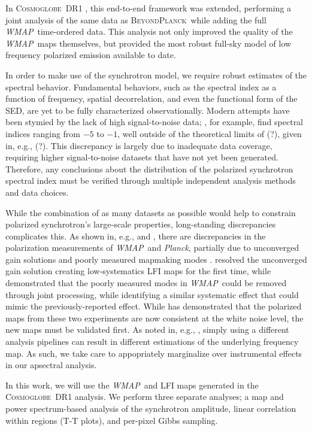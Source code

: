 \documentclass[twocolumn]{../../common/aa}
\def\WMAP{\emph{WMAP}}
\def\Planck{\emph{Planck}}
\newcommand{\bp}{\textsc{BeyondPlanck}}
\newcommand{\cosmoglobe}{\textsc{Cosmoglobe}}
\begin{document}
In \cosmoglobe\ DR1 \citep{watts2023_dr1}, this end-to-end framework was extended, performing a joint analysis of the same data as \bp\ while adding the full \WMAP\ time-ordered data. This analysis not only improved the quality of the \WMAP\ maps themselves, but provided the most robust full-sky model of low frequency polarized emission available to date.

In order to make use of the synchrotron model, we require robust estimates of the spectral behavior. Fundamental behaviors, such as the spectral index as a function of frequency, spatial decorrelation, and even the functional form of the SED, are yet to be fully characterized observationally. Modern attempts have been stymied by the lack of high signal-to-noise data; \citet{deBelsunce:2022}, for example, find spectral indices ranging from $-5$ to $-1$, well outside of the theoretical limits of (?), given in, e.g., (?). This discrepancy is largely due to inadequate data coverage, requiring higher signal-to-noise datasets that have not yet been generated. Therefore, any conclusions about the distribution of the polarized synchrotron spectral index must be verified through multiple independent analysis methods and data choices.


While the combination of as many datasets as possible would help to constrain polarized synchrotron's large-scale properties, long-standing discrepancies complicates this. As shown in, e.g., \citet{planck2014-a12} and \citet{weiland:2018}, there are discrepancies in the polarization measurements of \WMAP\ and \Planck, partially due to unconverged gain solutions \citep{planck2016-l02} and poorly measured mapmaking modes \citep{bennett2012}. \citet{bp01} resolved the unconverged gain solution creating low-systematics LFI maps for the first time, while \citet{bp17} demonstrated that the poorly measured modes in \WMAP\ could be removed through joint processing, while identifying a similar systematic effect that could mimic the previously-reported effect.  While \citet{watts2023_dr1} has demonstrated that the polarized maps from these two experiments are now consistent at the white noise level, the new maps must be validated first. As noted in, e.g., \citet{weiland:2022}, simply using a different analysis pipelines can result in different estimations of the underlying frequency map. As such, we take care to appopriately marginalize over instrumental effects in our apsectral analysis.


In this work, we will use the \WMAP\ and LFI maps generated in the \cosmoglobe\ DR1 analysis. We perform three separate analyses; a map and power spectrum-based analysis of the synchrotron amplitude, linear correlation within regions (T-T plots), and per-pixel Gibbs sampling.
\end{document}
